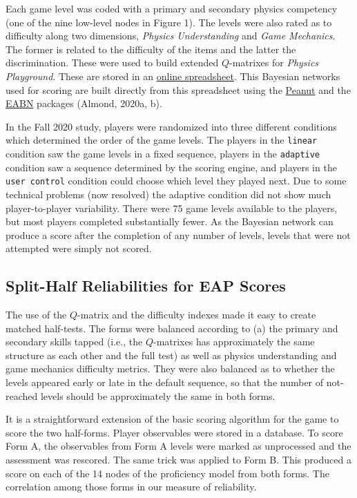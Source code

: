 \documentclass[]{article}
\begin{document}
Each game level was coded with a primary and secondary physics
competency (one of the nine low-level nodes in Figure 1). The levels
were also rated as to difficulty along two dimensions, \emph{Physics
Understanding} and \emph{Game Mechanics}. The former is related to the
difficulty of the items and the latter the discrimination. These were
used to build extended \(Q\)-matrixes for \emph{Physics Playground}.
These are stored in an
\href{https://docs.google.com/spreadsheets/d/16LcEuCspZjiBoZ3-Y1R3jxi1COXmh9vuTa9GwH1A_7Q/}{online
spreadsheet}. This Bayesian networks used for scoring are built directly
from this spreadsheet using the
\href{https://github.com/ralmond/Peanut}{Peanut} and the
\href{https://github.com/ralmond/EABN}{EABN} packages (Almond, 2020a,
b).

In the Fall 2020 study, players were randomized into three different
conditions which determined the order of the game levels. The players in
the \texttt{linear} condition saw the game levels in a fixed sequence,
players in the \texttt{adaptive} condition saw a sequence determined by
the scoring engine, and players in the \texttt{user\ control} condition
could choose which level they played next. Due to some technical
problems (now resolved) the adaptive condition did not show much
player-to-player variability. There were 75 game levels available to the
players, but most players completed substantially fewer. As the Bayesian
network can produce a score after the completion of any number of
levels, levels that were not attempted were simply not scored.

\subsection{Split-Half Reliabilities for EAP
Scores}\label{split-half-reliabilities-for-eap-scores}

The use of the \(Q\)-matrix and the difficulty indexes made it easy to
create matched half-tests. The forms were balanced according to (a) the
primary and secondary skills tapped (i.e., the \(Q\)-matrixes has
approximately the same structure as each other and the full test) as
well as physics understanding and game mechanics difficulty metrics.
They were also balanced as to whether the levels appeared early or late
in the default sequence, so that the number of not-reached levels should
be approximately the same in both forms.

It is a straightforward extension of the basic scoring algorithm for the
game to score the two half-forms. Player observables were stored in a
database. To score Form A, the observables from Form A levels were
marked as unprocessed and the assessment was rescored. The same trick
was applied to Form B. This produced a score on each of the 14 nodes of
the proficiency model from both forms. The correlation among those forms
in our measure of reliability.
\end{document}
